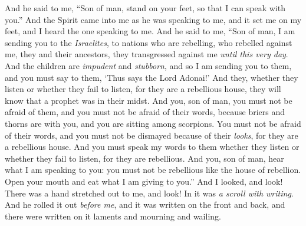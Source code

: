 \begin{biblechapter} %
 And he said to me, “Son of man, stand on your feet, so that I can speak with you.”
\verse And the Spirit came into me as he was speaking to me, and it set me on my feet, and I heard the one speaking to me.
\verse And he said to me, “Son of man, I am sending you to the \textit{Israelites}, to nations who are rebelling, who rebelled against me, they and their ancestors, they transgressed against me \textit{until this very day}.
\verse And the children are \textit{impudent} and \textit{stubborn}, and so I am sending you to them, and you must say to them, ‘Thus says the Lord Adonai!’
\verse And they, whether they listen or whether they fail to listen, for they are a rebellious house, they will know that a prophet was in their midst.
\verse And you, son of man, you must not be afraid of them, and you must not be afraid of their words, because briers and thorns are with you, and you are sitting among scorpions. You must not be afraid of their words, and you must not be dismayed because of their \textit{looks}, for they are a rebellious house.
\verse And you must speak my words to them whether they listen or whether they fail to listen, for they are rebellious.
\verse And you, son of man, hear what I am speaking to you: you must not be rebellious like the house of rebellion. Open your mouth and eat what I am giving to you.”
\verse And I looked, and look! There was a hand stretched out to me, and look! In it was \textit{a scroll with writing}.
\verse And he rolled it out \textit{before me}, and it was written on the front and back, and there were written on it laments and mourning and wailing.
\end{biblechapter}


